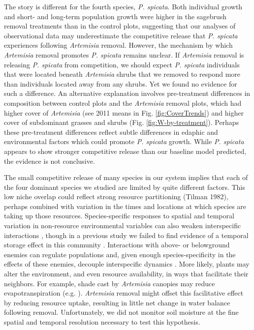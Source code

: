 \documentclass[11pt]{article}
\begin{document}
\begin{doublespacing}
The story is different for the fourth species, \textit{P. spicata}. Both individual growth and short- and long-term population growth were higher in the sagebrush removal treatments than in the control plots, suggesting that our analyses of observational data may underestimate the competitive release that \textit{P. spicata} experiences following \textit{Artemisia} removal. However, the mechanism by which \textit{Artemisia} removal promotes \textit{P. spicata} remains unclear. If  \textit{Artemisia} removal is releasing \textit{P. spicata} from competition, we should expect \textit{P. spicata} individuals that were located beneath \textit{Artemisia} shrubs that we removed to respond more than individuals located away from any shrubs. Yet we found no evidence for such a difference. An alternative explanation involves pre-treatment differences in composition between control plots and  the \textit{Artemisia} removal  plots, which had higher cover of \textit{Artemisia} (see 2011 means in Fig. \ref{fig:CoverTrends}) and higher cover of subdominant grasses and shrubs (Fig. \ref{fig:W-by-treatment}). Perhaps these pre-treatment differences reflect subtle differences in edaphic and environmental factors which could promote \textit{P. spicata} growth. While \textit{P. spicata} appears to show stronger competitive release than our baseline model predicted, the evidence is not conclusive. 

The small competitive release of many species in our system implies that each of the four dominant species we studied are limited by quite different factors. This low niche overlap could reflect strong resource partitioning (Tilman 1982), perhaps combined with variation in the times and locations at which species are taking up those resources. Species-specific responses to spatial and temporal variation in non-resource environmental variables can also weaken interspecific interactions \citep{chesson_mechanisms_2000}, though in a previous study we failed to find evidence of a temporal storage effect in this community \citep{adler_weak_2009}. Interactions with above- or belowground enemies can regulate populations and, given enough species-specificity in the effects of these enemies, decouple interspecific dynamics \citep{hersh_evaluating_2011,janzen_herbivores_1970,connell_role_1971}.  More likely, plants may alter the environment, and even resource availability, in ways that facilitate their neighbors. For example, shade cast by \textit{Artemisia} canopies may reduce evapotranspiration (e.g. \citealt{Barbier2008}). \textit{Artemisia} removal might offset this facilitative effect by reducing resource uptake, resulting in little net change in water balance following removal.  Unfortunately, we did not monitor soil moisture at the fine spatial and temporal resolution necessary to test this hypothesis.


\end{doublespacing}
\end{document}
